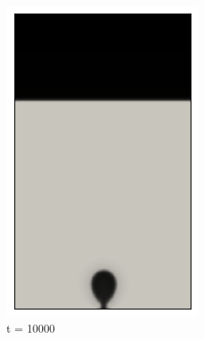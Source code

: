 \begin{figure}[H]
\begin{subfigure}{0.25\textwidth}
		\includegraphics[width=\linewidth]{figs/cap4/bb_760_s10}
		\caption{t = 10000}
		\label{fig:2}
	\end{subfigure}\hfil 
	\begin{subfigure}{0.25\textwidth}

\end{subfigure}
\end{figure}
